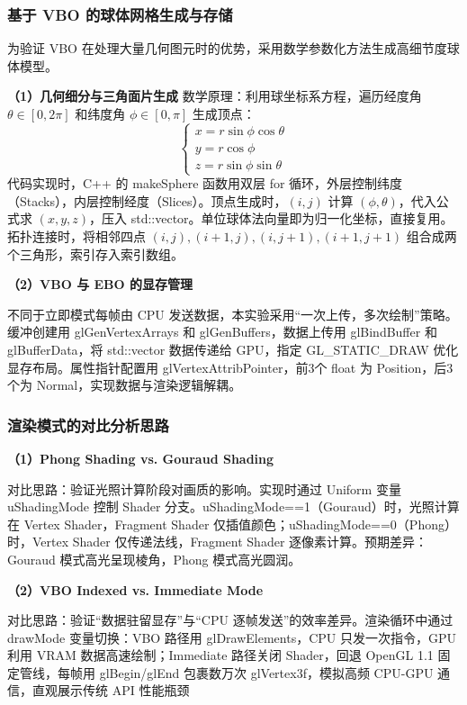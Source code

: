 \documentclass[a4paper]{article}
\begin{document}
\subsubsection{基于 VBO 的球体网格生成与存储}
为验证 VBO 在处理大量几何图元时的优势，采用数学参数化方法生成高细节度球体模型。

\textbf{（1）几何细分与三角面片生成}
数学原理：利用球坐标系方程，遍历经度角 $\theta \in [0, 2\pi]$ 和纬度角 $\phi \in [0, \pi]$ 生成顶点：
\[
\begin{cases}
x = r \sin\phi \cos\theta \\
y = r \cos\phi \\
z = r \sin\phi \sin\theta
\end{cases}
\]
代码实现时，C++ 的 makeSphere 函数用双层 for 循环，外层控制纬度（Stacks），内层控制经度（Slices）。顶点生成时，$(i, j)$ 计算 $(\phi, \theta)$，代入公式求 $(x, y, z)$，压入 std::vector。单位球体法向量即为归一化坐标，直接复用。拓扑连接时，将相邻四点 $(i, j), (i+1, j), (i, j+1), (i+1, j+1)$ 组合成两个三角形，索引存入索引数组。

\textbf{（2）VBO 与 EBO 的显存管理}

不同于立即模式每帧由 CPU 发送数据，本实验采用“一次上传，多次绘制”策略。缓冲创建用 glGenVertexArrays 和 glGenBuffers，数据上传用 glBindBuffer 和 glBufferData，将 std::vector 数据传递给 GPU，指定 GL\_STATIC\_DRAW 优化显存布局。属性指针配置用 glVertexAttribPointer，前3个 float 为 Position，后3个为 Normal，实现数据与渲染逻辑解耦。

\subsubsection{渲染模式的对比分析思路}

\textbf{（1）Phong Shading vs. Gouraud Shading}

对比思路：验证光照计算阶段对画质的影响。实现时通过 Uniform 变量 uShadingMode 控制 Shader 分支。uShadingMode==1（Gouraud）时，光照计算在 Vertex Shader，Fragment Shader 仅插值颜色；uShadingMode==0（Phong）时，Vertex Shader 仅传递法线，Fragment Shader 逐像素计算。预期差异：Gouraud 模式高光呈现棱角，Phong 模式高光圆润。

\textbf{（2）VBO Indexed vs. Immediate Mode}

对比思路：验证“数据驻留显存”与“CPU 逐帧发送”的效率差异。渲染循环中通过 drawMode 变量切换：VBO 路径用 glDrawElements，CPU 只发一次指令，GPU 利用 VRAM 数据高速绘制；Immediate 路径关闭 Shader，回退 OpenGL 1.1 固定管线，每帧用 glBegin/glEnd 包裹数万次 glVertex3f，模拟高频 CPU-GPU 通信，直观展示传统 API 性能瓶颈
\end{document}
